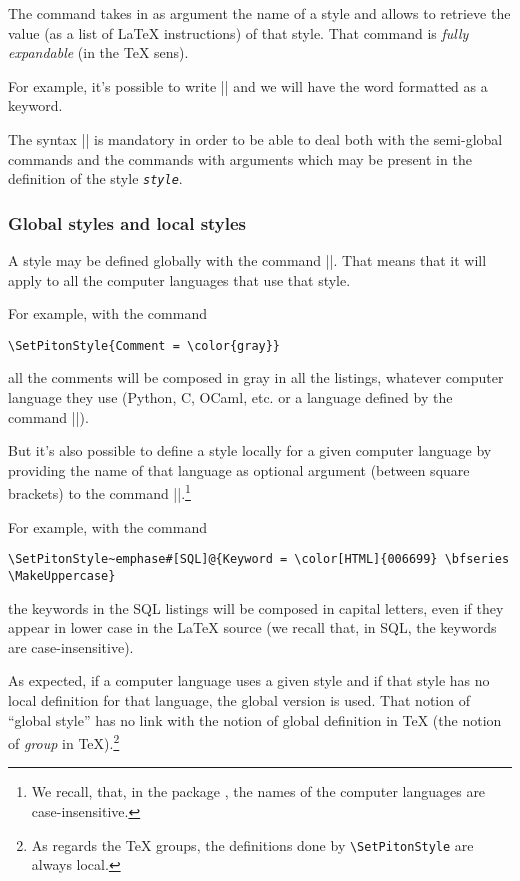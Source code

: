 \documentclass{article}
\begin{document}
\bigskip
{}
The command  takes in as argument the name of a
style and allows to retrieve the value (as a list of LaTeX instructions) of
that style. That command is \emph{fully expandable} (in the TeX sens).

\smallskip
For example, it's possible to write |{}| and we
will have the word {} formatted as a keyword.

\smallskip
The syntax |{}| is mandatory in
order to be able to deal both with the semi-global commands and the commands
with arguments which may be present in the definition of the style
\texttt{\textsl{style}}. 

\bigskip
\subsubsection{Global styles and local styles}

A style may be defined globally with the command |\SetPitonStyle|. That means
that it will apply to all the computer languages that use that style.

\bigskip
For example, with the command
\begin{Verbatim}
\SetPitonStyle{Comment = \color{gray}}
\end{Verbatim}
all the comments will be composed in gray in all the listings, whatever
computer language they use (Python, C, OCaml, etc. or a language defined by
the command |\NewPitonLanguage|).

\bigskip
But it's also possible to define a style locally for a given computer
language by providing the name of that language as optional argument (between
square brackets) to the command |\SetPitonStyle|.\footnote{We recall, that, in
the package , the names of the computer languages are
case-insensitive.}

\bigskip
For example, with the command
\begin{Verbatim}
\SetPitonStyle~emphase#[SQL]@{Keyword = \color[HTML]{006699} \bfseries \MakeUppercase}
\end{Verbatim}
the keywords in the SQL listings will be composed in capital letters, even if
they appear in lower case in the LaTeX source (we recall that, in SQL, the
keywords are case-insensitive).

\bigskip
As expected, if a computer language uses a given style and if that style has
no local definition for that language, the global version is used. That notion
of ``global style'' has no link with the notion of global definition in TeX
(the notion of \emph{group} in TeX).\footnote{As regards the TeX groups, the
definitions done by \texttt{\textbackslash SetPitonStyle} are always local.}
\end{document}
